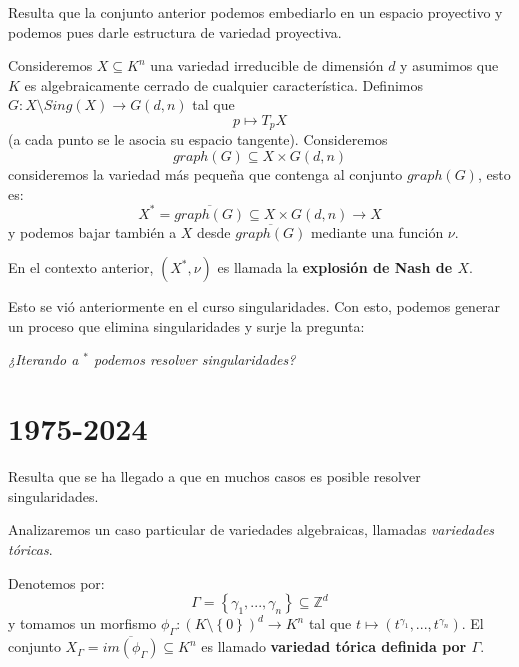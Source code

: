 \documentclass[12pt]{report}
\newcounter{it}
\theoremstyle{largebreak}
\newcommand\cf[3]{\ensuremath{#1:#2\rightarrow#3}}
\begin{document}
    Resulta que la conjunto anterior podemos embediarlo en un espacio proyectivo y podemos pues darle estructura de variedad proyectiva.

    Consideremos $X\subseteq K^n$ una variedad irreducible de dimensión $d$ y asumimos que $K$ es algebraicamente cerrado de cualquier característica. Definimos $\cf{G}{X\setminus Sing(X)}{G(d,n)}$ tal que
    \begin{equation*}
        p\mapsto T_pX
    \end{equation*}
    (a cada punto se le asocia su espacio tangente). Consideremos
    \begin{equation*}
        graph(G)\subseteq X\times G(d,n)
    \end{equation*}
    consideremos la variedad más pequeña que contenga al conjunto $graph(G)$, esto es:
    \begin{equation*}
        X^*=\overline{graph(G)}\subseteq X\times G(d,n)\rightarrow X
    \end{equation*}
    y podemos bajar también a $X$ desde $\overline{graph(G)}$ mediante una función $\nu$.
    
    \begin{mydef}
        En el contexto anterior, $(X^*,\nu)$ es llamada la \textbf{explosión de Nash de $X$}.
    \end{mydef}

    Esto se vió anteriormente en el curso singularidades. Con esto, podemos generar un proceso que elimina singularidades y surje la pregunta:

    \begin{center}
        \textit{¿Iterando a ${}^*$ podemos resolver singularidades?}
    \end{center}

    \section{1975-2024}

    Resulta que se ha llegado a que en muchos casos es posible resolver singularidades.

    Analizaremos un caso particular de variedades algebraicas, llamadas \textit{variedades tóricas}.

    \begin{mydef}
        Denotemos por:
        \begin{equation*}
            \Gamma=\left\{\gamma_1,...,\gamma_n \right\}\subseteq\mathbb{Z}^d
        \end{equation*}
        y tomamos un morfismo $\cf{\phi_\Gamma}{(K\setminus\left\{ 0\right\})^d}{K^n}$ tal que $t\mapsto (t^{\gamma_1},...,t^{\gamma_n})$. El conjunto $X_\Gamma=\overline{im(\phi_\Gamma)}\subseteq K^n$ es llamado \textbf{variedad tórica definida por $\Gamma$}.
    \end{mydef}
\end{document}
